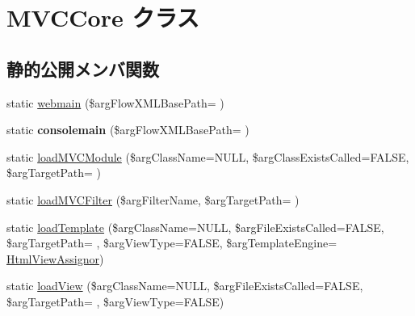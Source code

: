 \hypertarget{class_m_v_c_core}{}\section{M\+V\+C\+Core クラス}
\label{class_m_v_c_core}
\subsection*{静的公開メンバ関数}
\begin{DoxyCompactItemize}
\item 
static \hyperlink{class_m_v_c_core_a586d3831211555544f39242a2eddd1d9}{webmain} (\$arg\+Flow\+X\+M\+L\+Base\+Path= \textquotesingle{}\textquotesingle{})
\item 
\hypertarget{class_m_v_c_core_aef631bde3989df4f2b34685a4cf6878c}{}static {\bfseries consolemain} (\$arg\+Flow\+X\+M\+L\+Base\+Path= \textquotesingle{}\textquotesingle{})\label{class_m_v_c_core_aef631bde3989df4f2b34685a4cf6878c}

\item 
static \hyperlink{class_m_v_c_core_af300736b8ef9af5c298e16b91cdb68e1}{load\+M\+V\+C\+Module} (\$arg\+Class\+Name=N\+U\+L\+L, \$arg\+Class\+Exists\+Called=F\+A\+L\+S\+E, \$arg\+Target\+Path= \textquotesingle{}\textquotesingle{})
\item 
static \hyperlink{class_m_v_c_core_a728cd61380f5331ee3420ff4a8f3ae10}{load\+M\+V\+C\+Filter} (\$arg\+Filter\+Name, \$arg\+Target\+Path= \textquotesingle{}\textquotesingle{})
\item 
static \hyperlink{class_m_v_c_core_ae4f2a29faa032b6a092593a5bbe5a5b5}{load\+Template} (\$arg\+Class\+Name=N\+U\+L\+L, \$arg\+File\+Exists\+Called=F\+A\+L\+S\+E, \$arg\+Target\+Path= \textquotesingle{}\textquotesingle{}, \$arg\+View\+Type=F\+A\+L\+S\+E, \$arg\+Template\+Engine= \textquotesingle{}\hyperlink{class_html_view_assignor}{Html\+View\+Assignor}\textquotesingle{})
\item 
static \hyperlink{class_m_v_c_core_ae5c6d4b499b71f7ddb02eeba80d185e0}{load\+View} (\$arg\+Class\+Name=N\+U\+L\+L, \$arg\+File\+Exists\+Called=F\+A\+L\+S\+E, \$arg\+Target\+Path= \textquotesingle{}\textquotesingle{}, \$arg\+View\+Type=F\+A\+L\+S\+E)
\end{DoxyCompactItemize}
